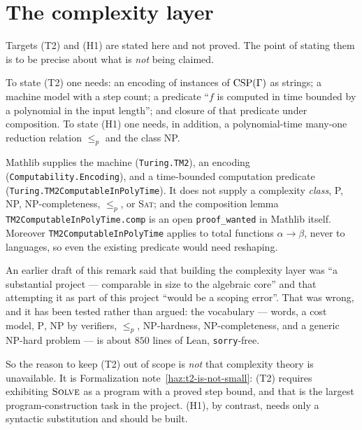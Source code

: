 \section{The complexity layer}\label{sec:complexity-layer}

Targets \textup{(T2)} and \textup{(H1)} are stated here and not proved. The
point of stating them is to be precise about what is \emph{not} being claimed.

\begin{definition}\label{def:cost-model}
To state \textup{(T2)} one needs: an encoding of instances of $\operatorname{CSP}(\Gamma)$ as
strings; a machine model with a step count; a predicate ``$f$ is computed in
time bounded by a polynomial in the input length''; and closure of that
predicate under composition. To state \textup{(H1)} one needs, in addition, a
polynomial-time many-one reduction relation $\le_{p}$ and the class
\textup{NP}.
\end{definition}

Mathlib supplies the machine (\texttt{Turing.TM2}), an encoding
(\texttt{Computability.Encoding}), and a time-bounded computation predicate
(\texttt{Turing.TM2ComputableInPolyTime}). It does not supply a complexity
\emph{class}, \textup{P}, \textup{NP}, \textup{NP}-completeness, $\le_{p}$, or
\textsc{Sat}; and the composition lemma
\texttt{TM2ComputableInPolyTime.comp} is an open \texttt{proof\_wanted} in
Mathlib itself. Moreover \texttt{TM2ComputableInPolyTime} applies to total
functions $\alpha\to\beta$, never to languages, so even the existing predicate
would need reshaping.

\begin{remark}\label{rem:complexity-scope}
An earlier draft of this remark said that building the complexity layer was
``a substantial project --- comparable in size to the algebraic core'' and that
attempting it as part of this project ``would be a scoping error''. That was
wrong, and it has been tested rather than argued: the vocabulary --- words, a
cost model, $\mathrm P$, $\mathrm{NP}$ by verifiers, $\le_{p}$,
\textup{NP}-hardness, \textup{NP}-completeness, and a generic
\textup{NP}-hard problem --- is about $850$ lines of Lean, \texttt{sorry}-free.

So the reason to keep \textup{(T2)} out of scope is \emph{not} that complexity
theory is unavailable. It is Formalization note~\ref{haz:t2-is-not-small}: \textup{(T2)}
requires exhibiting $\textsc{Solve}$ as a program with a proved step bound, and
that is the largest program-construction task in the project. \textup{(H1)},
by contrast, needs only a syntactic substitution and should be built.
\end{remark}

